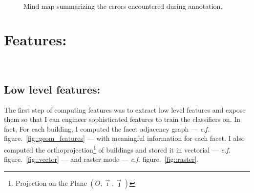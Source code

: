 \documentclass[a4paper, 11pt]{article}
\begin{document}
	\begin{landscape}
		\begin{figure}
			\begin{center}
				
				\caption{\label{fig::mindmap_errors} Mind map summarizing the errors encountered during annotation.}
			\end{center}
		\end{figure}
	\end{landscape}

	\section{Features:}
~\\

	\subsection{Low level features:}


	The first step of computing features was to extract low level features and expose them so that I can engineer sophisticated features to train the classifiers on. In fact, For each building, I computed the facet adjacency graph --- \textit{c.f.} figure.~\ref{fig::geom_features} --- with meaningful information for each facet. I also computed the orthoprojection\footnote{Projection on the Plane $(O, \vec{\imath}, \vec{\jmath})$} of buildings and stored it in vectorial --- \textit{c.f.} figure.~\ref{fig::vector} --- and raster mode --- \textit{c.f.} figure.~\ref{fig::raster}.\\
\end{document}
